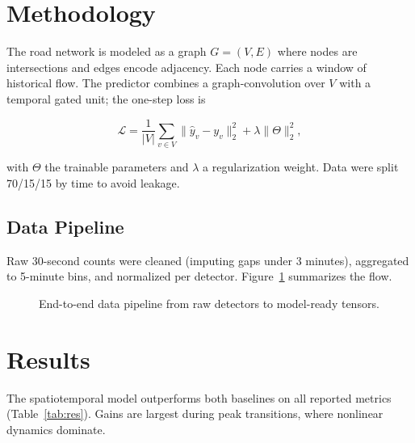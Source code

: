 \documentclass[11pt]{article}
\begin{document}
\section{Methodology}
The road network is modeled as a graph $G=(V,E)$ where nodes are intersections and edges
encode adjacency. Each node carries a window of historical flow. The predictor combines a
graph-convolution over $V$ with a temporal gated unit; the one-step loss is

\begin{equation}
\mathcal{L}=\frac{1}{|V|}\sum_{v\in V}\bigl\lVert \hat{y}_v - y_v\bigr\rVert_2^2
           +\lambda\lVert\Theta\rVert_2^2,
\end{equation}

with $\Theta$ the trainable parameters and $\lambda$ a regularization weight. Data were
split 70/15/15 by time to avoid leakage.

\subsection{Data Pipeline}
Raw 30-second counts were cleaned (imputing gaps under 3 minutes), aggregated to 5-minute
bins, and normalized per detector. Figure~\ref{fig:pipe} summarizes the flow.

\begin{figure}[ht]\centering
{}
\caption{End-to-end data pipeline from raw detectors to model-ready tensors.}
\label{fig:pipe}
\end{figure}

\section{Results}
The spatiotemporal model outperforms both baselines on all reported metrics
(Table~\ref{tab:res}). Gains are largest during peak transitions, where nonlinear dynamics
dominate.
\end{document}
